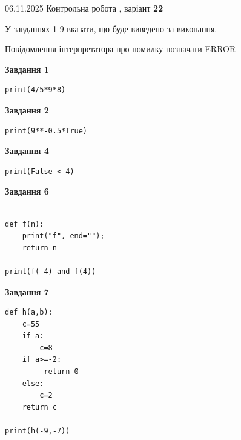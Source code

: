 \documentclass[12pt, ukrainian]{article}
\begin{document}
{\Large{06.11.2025 Контрольна робота , варіант  \No \textbf { 22 }\par}}
{
\begin {large}
У завданнях 1-9 вказати, що буде виведено за виконання.

Повідомлення інтерпретатора про помилку позначати ERROR

\begin{minipage}[t]{7.5cm}

\begin{center}
\textbf{Завдання 1}
\end{center}

\begin{verbatim}
print(4/5*9*8)
\end{verbatim}



\begin{center}
\textbf{Завдання 2}
\end{center}

\begin{verbatim}
print(9**-0.5*True)
\end{verbatim}



\begin{center}
\textbf{Завдання 4}
\end{center}

\begin{verbatim}
print(False < 4)
\end{verbatim}



\begin{center}
\textbf{Завдання 6}
\end{center}

\begin{verbatim}

def f(n):
    print("f", end="");
    return n

print(f(-4) and f(4))
\end{verbatim}



\begin{center}
\textbf{Завдання 7}
\end{center}

\begin{verbatim}
def h(a,b):
    c=55
    if a:
        c=8
    if a>=-2:
         return 0
    else: 
        c=2
    return c

print(h(-9,-7))
\end{verbatim}


\end{minipage}
\end{large}}
\end{document}
